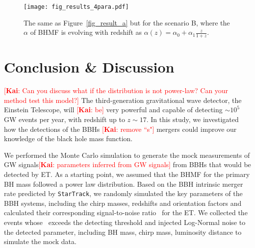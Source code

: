 \documentclass[twocolumn]{aastex62}
\newcommand{\kai}[1]{\textcolor{red}{[{\bf Kai}: #1]}}
\begin{document}
\begin{figure}%
\texttt{[image: fig\_results\_4para.pdf]}
\caption{
The same as Figure~\ref{fig_result_a} but for the scenario B, where the $\alpha$ of BHMF is evolving with redshift as $\alpha(z) = \alpha_0 + \alpha_1\frac{z}{1+z}$. 
}
\label{fig_result_b}
\end{figure}

\vspace{1cm}
\section{Conclusion \& Discussion} \label{sec_summary}
\kai{Can you discuss what if the distribution is not power-law? Can your method test this model?}
The third-generation gravitational wave detector, the Einstein Telescope, will \kai{be} very powerful and capable of detecting $\sim10^5$ GW events per year, with redshift up to $z\sim17$. In this study, we investigated how the detections of the BBHs \kai{remove ``s"} mergers could improve our knowledge of the black hole mass function.

We performed the Monte Carlo simulation to generate the mock measurements of GW signals\kai{parameters inferred from GW signals} from BBHs that would be detected by ET. As a starting point, we assumed that the BHMF for the primary BH mass followed a power law distribution. Based on the BBH intrinsic merger rate predicted by {\tt StarTrack}, we randomly simulated the key parameters of the BBH systems, including the chirp masses, redshifts and orientation factors and calculated  their corresponding signal-to-noise ratio \snr\ for the ET. We collected the events whose \snr\ exceeds the detecting threshold and injected Log-Normal noise to the detected parameter, including BH mass, chirp mass, luminosity distance to simulate the mock data.
\end{document}
